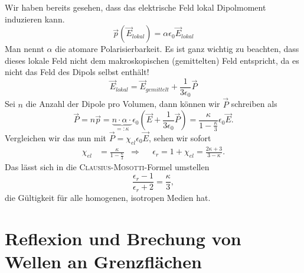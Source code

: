 Wir haben bereits gesehen, dass das elektrische Feld lokal Dipolmoment induzieren kann.
\begin{equation*}
\vec{p}\left(\vec{E}_\textit{lokal}\right) = \alpha\epsilon_0\vec{E}_\textit{lokal}
\end{equation*}
Man nennt $\alpha$ die atomare Polarisierbarkeit. Es ist ganz wichtig zu beachten, dass dieses lokale Feld nicht dem makroskopischen (gemittelten) Feld entspricht, da es nicht das Feld des Dipols selbst enthält! \\
\begin{equation*}
\vec{E}_\textit{lokal}=\vec{E}_\textit{gemittelt} + \frac{1}{3\epsilon_0}\vec{P}
\end{equation*}
Sei $n$ die Anzahl der Dipole pro Volumen, dann können wir $\vec{P}$ schreiben als
\begin{equation*}
\vec{P}=n\vec{p} = \underbrace{n\cdot\alpha\cdot}_{=:\kappa}\epsilon_0\left(\vec{E}+\frac{1}{3\epsilon_0}\vec{P}\right) =\frac{\kappa}{1-\frac{\kappa}{3}}\epsilon_0\vec{E}.
\end{equation*}
Vergleichen wir das nun mit $\vec{P}=\chi_\textit{el}\epsilon_0\vec{E}$, sehen wir sofort
\begin{align*}
\chi_\textit{el}&=\frac{\kappa}{1-\frac{\kappa}{3}} &\Rightarrow& &\epsilon_r = 1+ \chi_\textit{el}=\frac{2\kappa+3}{3-\kappa}.
\end{align*}
Das lässt sich in die \textsc{Clausius-Mosotti}-Formel umstellen
\begin{equation*}
\frac{\epsilon_r-1}{\epsilon_r+2}=\frac{\kappa}{3},
\end{equation*}
die Gültigkeit für alle homogenen, isotropen Medien hat.

\section{Reflexion und Brechung von Wellen an Grenzflächen}

